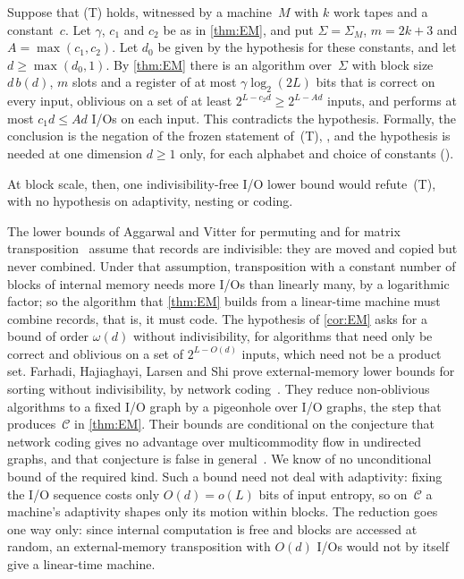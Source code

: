 \begin{outline}
Suppose that (T) holds, witnessed by a machine~$M$ with $k$ work tapes and a constant~$c$. Let $\gamma$, $c_1$ and $c_2$
be as in \cref{thm:EM}, and put $\Sigma=\Sigma_M$, $m=2k+3$ and $A=\max(c_1,c_2)$. Let $d_0$ be given by the hypothesis
for these constants, and let $d\ge\max(d_0,1)$. By \cref{thm:EM} there is an algorithm over~$\Sigma$ with block size
$d\,b(d)$, $m$ slots and a register of at most $\gamma\log_2(2L)$ bits that is correct on every input, oblivious on a set
of at least $2^{L-c_2d}\ge2^{L-Ad}$ inputs, and performs at most $c_1d\le Ad$ I/Os on each input. This contradicts the
hypothesis. Formally, the conclusion is the negation of the frozen statement of~(T), ,
and the hypothesis  is needed at one dimension $d\ge1$ only, for each alphabet and choice
of constants ().
\end{outline}

At block scale, then, one indivisibility-free I/O lower bound would refute~(T), with no hypothesis on adaptivity, nesting
or coding.

\begin{remark}\label{rem:EM-status}
The lower bounds of Aggarwal and Vitter for permuting and for matrix transposition~\cite{AggarwalVitter1988} assume that
records are indivisible: they are moved and copied but never combined. Under that assumption, transposition with a
constant number of blocks of internal memory needs more I/Os than linearly many, by a logarithmic factor; so the
algorithm that \cref{thm:EM} builds from a linear-time machine must combine records, that is, it must code. The
hypothesis of \cref{cor:EM} asks for a bound of order $\omega(d)$ without indivisibility, for algorithms that need only be
correct and oblivious on a set of $2^{L-O(d)}$ inputs, which need not be a product set. Farhadi, Hajiaghayi, Larsen and
Shi prove external-memory lower bounds for sorting without indivisibility, by network coding~\cite{FHLS2019}. They reduce
non-oblivious algorithms to a fixed I/O graph by a pigeonhole over I/O graphs, the step that produces~$\mathcal C$ in
\cref{thm:EM}. Their bounds are conditional on the conjecture that network coding gives no advantage over multicommodity
flow in undirected graphs, and that conjecture is false in general~\cite{BravermanHe2026}. We know of no unconditional
bound of the required kind. Such a bound need not deal with adaptivity: fixing the I/O sequence costs only $O(d)=o(L)$
bits of input entropy, so on~$\mathcal C$ a machine's adaptivity shapes only its motion within blocks. The reduction goes
one way only: since internal computation is free and blocks are accessed at random, an external-memory transposition with
$O(d)$ I/Os would not by itself give a linear-time machine.
\end{remark}
